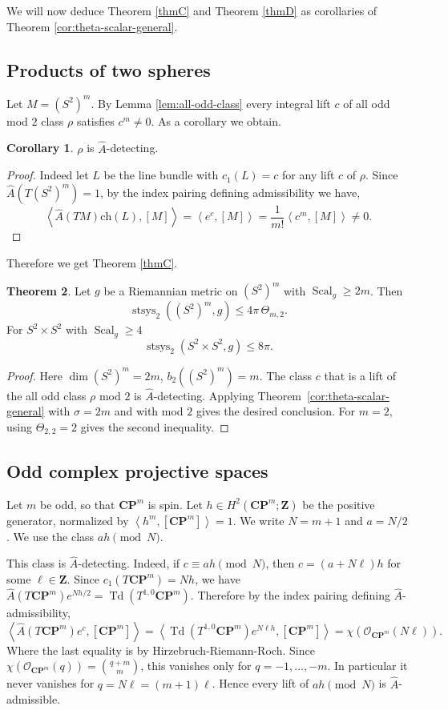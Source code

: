 \documentclass[11pt,reqno]{amsart}
\numberwithin{equation}{section}
\numberwithin{equation}{section}
\theoremstyle{definition}
\newtheorem{theorem}{Theorem}[section]
\newtheorem{corollary}[theorem]{Corollary}
\newcommand{\Z}{\mathbf Z}
\newcommand{\CP}{\mathbf{CP}}
\DeclareMathOperator{\Scal}{Scal}
\DeclareMathOperator{\stsys}{stsys}
\DeclareMathOperator{\Td}{Td}
\newcommand{\Ah}{\widehat A}
\newcommand{\ip}[2]{\left\langle #1,#2\right\rangle}
\begin{document}
We will now deduce Theorem \ref{thmC} and Theorem \ref{thmD} as corollaries of Theorem \ref{cor:theta-scalar-general}.

 \subsection{Products of two spheres}

Let \(M=(S^2)^m\). By Lemma \ref{lem:all-odd-class} every integral lift $c$ of all odd mod $2$ class $\rho$ satisfies $c^m \neq0$. As a corollary we obtain. 

\begin{corollary}
$\rho$ is $\Ah$-detecting. 
\end{corollary}
\begin{proof}
Indeed let $L$ be the line bundle with $c_1(L)=c$ for any lift $c$ of $\rho$.  Since \(\Ah(T(S^2)^m)=1\), by the index pairing defining admissibility we have,
\[
\ip{\Ah(TM)\mathrm{ch}(L)}{[M]}
= \ip{e^c}{[M]} = \frac{1}{m!} \ip{c^m}{[M]}
\neq0.
\]
\end{proof}

Therefore we get Theorem \ref{thmC}.

\begin{theorem}\label{cor:product-spheres-scalar}
Let \(g\) be a Riemannian metric on \((S^2)^m\) with \(\Scal_g\ge2m\). Then
\[
\stsys_2((S^2)^m,g)
\le
4\pi\,\Theta_{m,2}.
\]
For $S^2 \times S^2$ with $\Scal_g \geq 4$ \[
\stsys_2(S^2 \times S^2,g)
\le
8\pi.
\]
\end{theorem}

\begin{proof}
Here \(\dim (S^2)^m=2m\), \(b_2((S^2)^m)=m\). The class $c$ that is a lift of the all odd class $\rho$ mod \(2\) is \(\Ah\)-detecting. Applying Theorem~\ref{cor:theta-scalar-general} with \(\sigma=2m\) and with mod \(2\) gives the desired conclusion. For $m=2$, using $\Theta_{2,2}=2$ gives the second inequality. 
\end{proof}
 

\subsection{Odd complex projective spaces}

Let \(m\) be odd, so that \(\CP^m\) is spin. Let \(h\in H^2(\CP^m;\Z)\) be the positive generator, normalized by \(\ip{h^m}{[\CP^m]}=1\). We write \(N=m+1\) and \(a=N/2\). We use the class \(ah\pmod N\). 

This class is \(\Ah\)-detecting. Indeed, if \(c\equiv ah\pmod N\), then \(c=(a+N\ell)h\) for some \(\ell\in\Z\). Since \(c_1(T\CP^m)=Nh\), we have \(\Ah(T\CP^m)e^{Nh/2}=\Td(T^{1,0}\CP^m).\) Therefore by the index pairing defining $\Ah$-admissibility,
\[
\ip{\Ah(T\CP^m)e^c}{[\CP^m]}
=
\ip{\Td(T^{1,0}\CP^m)e^{N\ell h}}{[\CP^m]}
=
\chi(\mathcal O_{\CP^m}(N\ell)).
\]
Where the last equality is by Hirzebruch-Riemann-Roch. Since \(\chi(\mathcal O_{\CP^m}(q))=\binom{q+m}{m}\), this vanishes only for \(q=-1,\ldots,-m\). In particular it never vanishes for \(q=N\ell=(m+1)\ell\). Hence every lift of \(ah\pmod N\) is \(\Ah\)-admissible.
\end{document}
